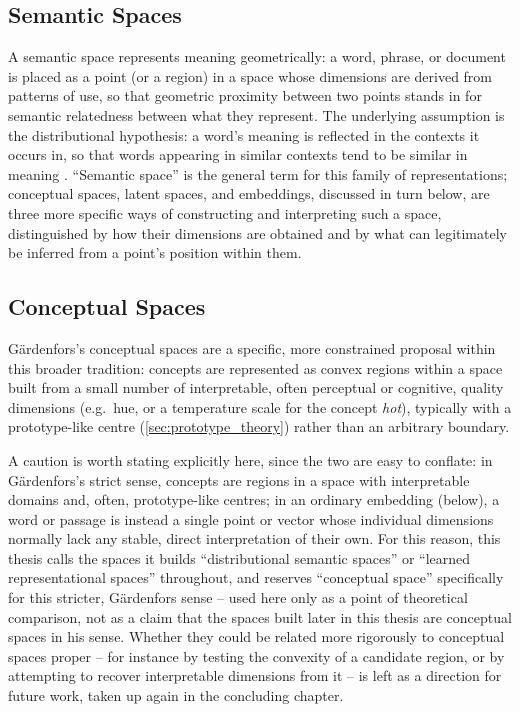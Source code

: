 \subsection{Semantic Spaces}
A semantic space represents meaning geometrically: a word, phrase, or document is placed as a point (or a region) in a space whose dimensions are derived from patterns of use, so that geometric proximity between two points stands in for semantic relatedness between what they represent. The underlying assumption is the distributional hypothesis: a word's meaning is reflected in the contexts it occurs in, so that words appearing in similar contexts tend to be similar in meaning \autocite{harrisDistributionalStructure1954, firth1957synopsis}. \enquote{Semantic space} is the general term for this family of representations; conceptual spaces, latent spaces, and embeddings, discussed in turn below, are three more specific ways of constructing and interpreting such a space, distinguished by how their dimensions are obtained and by what can legitimately be inferred from a point's position within them.

\subsection{Conceptual Spaces}
Gärdenfors's conceptual spaces \autocite{gardenforsConceptualSpacesGeometry2000, gardenforsConceptualSpacesGeometry2004} are a specific, more constrained proposal within this broader tradition: concepts are represented as convex regions within a space built from a small number of interpretable, often perceptual or cognitive, quality dimensions (e.g.\ hue, or a temperature scale for the concept \textit{hot}), typically with a prototype-like centre (\ref{sec:prototype_theory}) rather than an arbitrary boundary.

A caution is worth stating explicitly here, since the two are easy to conflate: in Gärdenfors's strict sense, concepts are regions in a space with interpretable domains and, often, prototype-like centres; in an ordinary embedding (below), a word or passage is instead a single point or vector whose individual dimensions normally lack any stable, direct interpretation of their own. For this reason, this thesis calls the spaces it builds \enquote{distributional semantic spaces} or \enquote{learned representational spaces} throughout, and reserves \enquote{conceptual space} specifically for this stricter, Gärdenfors sense -- used here only as a point of theoretical comparison, not as a claim that the spaces built later in this thesis are conceptual spaces in his sense. Whether they could be related more rigorously to conceptual spaces proper -- for instance by testing the convexity of a candidate region, or by attempting to recover interpretable dimensions from it -- is left as a direction for future work, taken up again in the concluding chapter.



